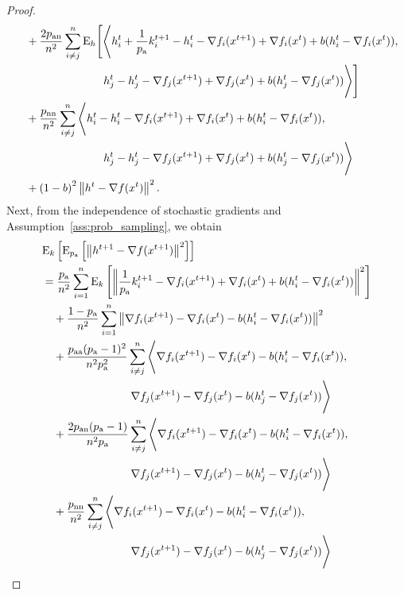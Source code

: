 \documentclass{article}
\begin{document}
\begin{proof}
\begin{align*}
      &\quad +\frac{2p_{\textnormal{an}}}{n^2}\sum_{i \neq j}^n{\rm E}_{h}\Bigg[\Bigg\langle h^{t}_i + \frac{1}{p_{\textnormal{a}}}k^{t+1}_i - h^{t}_i - \nabla f_i(x^{t+1}) + \nabla f_i(x^{t}) + b(h^t_i - \nabla f_i(x^{t})),\\
      &\qquad\qquad\qquad\qquad h^{t}_j - h^{t}_j - \nabla f_j(x^{t+1}) + \nabla f_j(x^{t}) + b(h^t_j - \nabla f_j(x^{t}))\Bigg\rangle\Bigg] \\
      &\quad +\frac{p_{\textnormal{nn}}}{n^2}\sum_{i \neq j}^n\Bigg\langle h^{t}_i - h^{t}_i - \nabla f_i(x^{t+1}) + \nabla f_i(x^{t}) + b(h^t_i - \nabla f_i(x^{t})), \\
      &\qquad\qquad\qquad\qquad h^{t}_j - h^{t}_j - \nabla f_j(x^{t+1}) + \nabla f_j(x^{t}) + b(h^t_j - \nabla f_j(x^{t}))\Bigg\rangle \\
      &\quad + \left(1 - b\right)^2 \left\| h^{t} - \nabla f(x^{t}) \right\|^2.
  \end{align*}
  Next, from the independence of stochastic gradients and Assumption~\ref{ass:prob_sampling}, we obtain
  \begin{align*}
    &\ExpSub{k}{\ExpSub{\probavailable}{\norm{h^{t+1} - \nabla f(x^{t+1})}^2}} \\
    &=\frac{\probavailable}{n^2}\sum_{i=1}^n \ExpSub{k}{\norm{\frac{1}{\probavailable}k^{t+1}_i - \nabla f_i(x^{t+1}) + \nabla f_i(x^{t}) + b(h^t_i - \nabla f_i(x^{t}))}^2} \\
    &\quad + \frac{1 - \probavailable}{n^2}\sum_{i=1}^n \norm{\nabla f_i(x^{t+1}) - \nabla f_i(x^{t}) - b(h^t_i - \nabla f_i(x^{t}))}^2 \\
    &\quad +\frac{\probpairaa(\probavailable - 1)^2}{n^2 \probavailable^2}\sum_{i \neq j}^n\Bigg\langle \nabla f_i(x^{t+1}) - \nabla f_i(x^{t}) - b(h^t_i - \nabla f_i(x^{t})), \\
    &\qquad\qquad\qquad\qquad \nabla f_j(x^{t+1}) - \nabla f_j(x^{t}) - b(h^t_j - \nabla f_j(x^{t}))\Bigg\rangle \\
    &\quad +\frac{2\probpairan (\probavailable - 1)}{n^2 \probavailable}\sum_{i \neq j}^n\Bigg\langle \nabla f_i(x^{t+1}) - \nabla f_i(x^{t}) - b(h^t_i - \nabla f_i(x^{t})),\\
    &\qquad\qquad\qquad\qquad \nabla f_j(x^{t+1}) - \nabla f_j(x^{t}) - b(h^t_j - \nabla f_j(x^{t}))\Bigg\rangle \\
    &\quad +\frac{\probpairnn}{n^2}\sum_{i \neq j}^n\Bigg\langle \nabla f_i(x^{t+1}) - \nabla f_i(x^{t}) - b(h^t_i - \nabla f_i(x^{t})), \\
    &\qquad\qquad\qquad\qquad \nabla f_j(x^{t+1}) - \nabla f_j(x^{t}) - b(h^t_j - \nabla f_j(x^{t}))\Bigg\rangle \\

\end{align*}
\end{proof}
\end{document}
